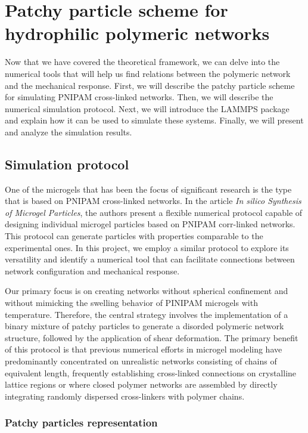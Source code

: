\chapter{Patchy particle scheme for hydrophilic polymeric networks}

Now that we have covered the theoretical framework, we can delve into the numerical tools that will help us find relations between the polymeric network and the mechanical response.
First, we will describe the patchy particle scheme for simulating PNIPAM cross-linked networks.
Then, we will describe the numerical simulation protocol.
Next, we will introduce the LAMMPS package and explain how it can be used to simulate these systems.
Finally, we will present and analyze the simulation results.

\section{Simulation protocol}

One of the microgels that has been the focus of significant research is the type that is based on PNIPAM cross-linked networks.
In the article \textit{In silico Synthesis of Microgel Particles}\citep{gnanSilicoSynthesisMicrogel2017}, the authors present a flexible numerical protocol capable of designing individual microgel particles based on PNIPAM corr-linked networks. 
This protocol can generate particles with properties comparable to the experimental ones.
In this project, we employ a similar protocol to explore its versatility and identify a numerical tool that can facilitate connections between network configuration and mechanical response.

Our primary focus is on creating networks without spherical confinement and without mimicking the swelling behavior of PINIPAM microgels with temperature.
Therefore, the central strategy involves the implementation of a binary mixture of patchy particles to generate a disorded polymeric network structure, followed by the application of shear deformation.
The primary benefit of this protocol is that previous numerical efforts in microgel modeling have predominantly concentrated on unrealistic networks consisting of chains of equivalent length, frequently establishing cross-linked connections on crystalline lattice regions or where closed polymer networks are assembled by directly integrating randomly dispersed cross-linkers with polymer chains.

\subsection{Patchy particles representation}


